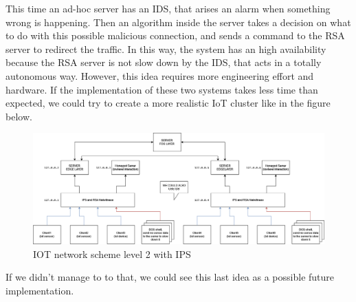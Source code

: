This time an ad-hoc server has an IDS, that arises an alarm when something wrong is happening. Then an algorithm inside the server takes a decision on what to do with this possible malicious connection, and sends a command to the RSA server to redirect the traffic. In this way, the system has an high availability because the RSA server is not slow down by the IDS, that acts in a totally autonomous way. However, this idea requires more engineering effort and hardware. If the implementation of these two systems takes less time than expected, we could try to create a more realistic IoT cluster like in the figure below.
\begin{figure}[h!]
  \centering
  \includegraphics[width = 15cm]{images/IOTlevel2IPS.drawio.png}
  \caption{IOT network scheme level 2 with IPS}
  \label{fig:3period}
\end{figure}
\FloatBarrier
\noindent If we didn't manage to to that, we could see this last idea as a possible future implementation.

